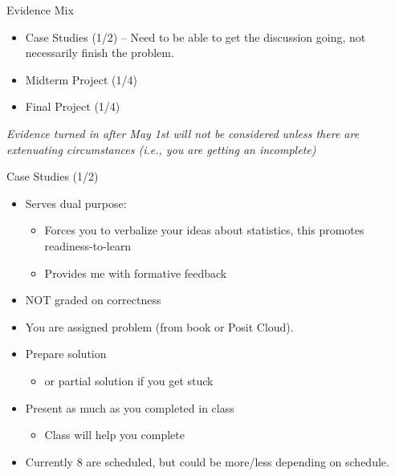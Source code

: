 \documentclass[
  ignorenonframetext,
]{beamer}
\providecommand{\tightlist}{%
  \setlength{\itemsep}{0pt}\setlength{\parskip}{0pt}}
\begin{document}
\begin{frame}{Evidence Mix}
\protect\hypertarget{evidence-mix}{}
\begin{itemize}
\item
  Case Studies (1/2) -- Need to be able to get the discussion going, not
  necessarily finish the problem.
\item
  Midterm Project (1/4)
\item
  Final Project (1/4)
\end{itemize}

\emph{Evidence turned in after May 1st will not be considered unless
there are extenuating circumstances (i.e., you are getting an
incomplete)}
\end{frame}

\begin{frame}{Case Studies (1/2)}
\protect\hypertarget{case-studies-12}{}
\begin{itemize}
\tightlist
\item
  Serves dual purpose:

  \begin{itemize}
  \tightlist
  \item
    Forces you to verbalize your ideas about statistics, this promotes
    readiness-to-learn
  \item
    Provides me with formative feedback
  \end{itemize}
\item
  NOT graded on correctness
\item
  You are assigned problem (from book or Posit Cloud).
\item
  Prepare solution

  \begin{itemize}
  \tightlist
  \item
    or partial solution if you get stuck
  \end{itemize}
\item
  Present as much as you completed in class

  \begin{itemize}
  \tightlist
  \item
    Class will help you complete
  \end{itemize}
\item
  Currently 8 are scheduled, but could be more/less depending on
  schedule.
\end{itemize}
\end{frame}
\end{document}
